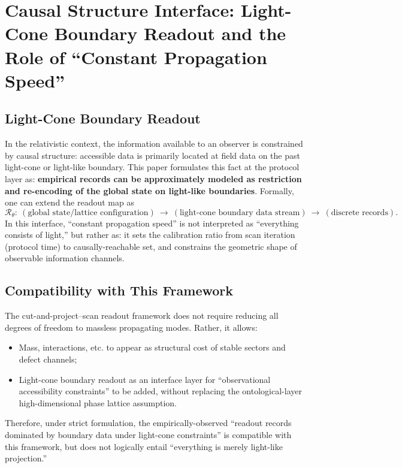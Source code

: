 \section{Causal Structure Interface: Light-Cone Boundary Readout and the Role of ``Constant Propagation Speed''}

\subsection{Light-Cone Boundary Readout}

In the relativistic context, the information available to an observer is constrained by causal structure: accessible data is primarily located at field data on the past light-cone or light-like boundary. This paper formulates this fact at the protocol layer as: \textbf{empirical records can be approximately modeled as restriction and re-encoding of the global state on light-like boundaries}. Formally, one can extend the readout map as
\[
\mathcal{R}_{\theta}:\ (\text{global state/lattice configuration}) \ \longrightarrow\  (\text{light-cone boundary data stream})\ \longrightarrow\  (\text{discrete records}).
\]
In this interface, ``constant propagation speed'' is not interpreted as ``everything consists of light,'' but rather as: it sets the calibration ratio from scan iteration (protocol time) to causally-reachable set, and constrains the geometric shape of observable information channels.

\subsection{Compatibility with This Framework}

The cut-and-project--scan readout framework does not require reducing all degrees of freedom to massless propagating modes. Rather, it allows:
\begin{itemize}
  \item Mass, interactions, etc. to appear as structural cost of stable sectors and defect channels;
  \item Light-cone boundary readout as an interface layer for ``observational accessibility constraints'' to be added, without replacing the ontological-layer high-dimensional phase lattice assumption.
\end{itemize}
Therefore, under strict formulation, the empirically-observed ``readout records dominated by boundary data under light-cone constraints'' is compatible with this framework, but does not logically entail ``everything is merely light-like projection.''
